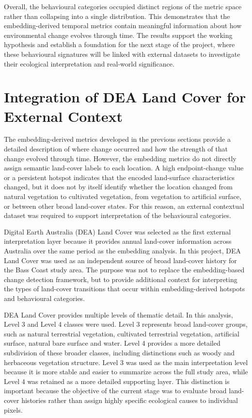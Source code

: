 \documentclass[11pt,a4paper]{article}
\begin{document}
Overall, the behavioural categories occupied distinct regions of the metric space rather than collapsing into a single distribution. This demonstrates that the embedding-derived temporal metrics contain meaningful information about how environmental change evolves through time. The results support the working hypothesis and establish a foundation for the next stage of the project, where these behavioural signatures will be linked with external datasets to investigate their ecological interpretation and real-world significance.

\section{Integration of DEA Land Cover for External Context}

The embedding-derived metrics developed in the previous sections provide a detailed description of where change occurred and how the strength of that change evolved through time. However, the embedding metrics do not directly assign semantic land-cover labels to each location. A high endpoint-change value or a persistent hotspot indicates that the encoded land-surface characteristics changed, but it does not by itself identify whether the location changed from natural vegetation to cultivated vegetation, from vegetation to artificial surface, or between other broad land-cover states. For this reason, an external contextual dataset was required to support interpretation of the behavioural categories.

Digital Earth Australia (DEA) Land Cover was selected as the first external interpretation layer because it provides annual land-cover information across Australia over the same period as the embedding analysis. In this project, DEA Land Cover was used as an independent source of broad land-cover history for the Bass Coast study area. The purpose was not to replace the embedding-based change detection framework, but to provide additional context for interpreting the types of land-cover transitions that occur within embedding-derived hotspots and behavioural categories.

DEA Land Cover provides multiple levels of thematic detail. In this analysis, Level 3 and Level 4 classes were used. Level 3 represents broad land-cover groups, such as natural terrestrial vegetation, cultivated terrestrial vegetation, artificial surface, natural bare surface and water. Level 4 provides a more detailed subdivision of these broader classes, including distinctions such as woody and herbaceous vegetation structure. Level 3 was used as the main interpretation level because it is more stable and easier to summarize across the full study area, while Level 4 was retained as a more detailed supporting layer. This distinction is important because the objective of the current stage was to evaluate broad land-cover histories rather than assign highly specific ecological causes to individual pixels.
\end{document}

